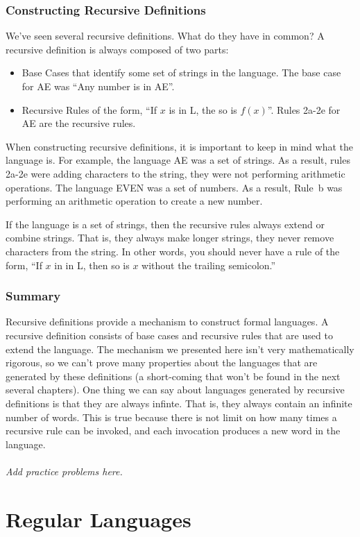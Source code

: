 \documentclass[letterpaper,12pt,openany,reqno]{book}%
\newcommand{\needsproblems}{\paragraph{Add practice problems here.}}
\begin{document}
\section{Constructing Recursive Definitions}
We've seen several recursive definitions. What do they have in common? A recursive definition is always composed of two parts:
\begin{itemize}
\item Base Cases that identify some set of strings in the language. The base case for AE was ``Any number is in AE''.
\item Recursive Rules of the form, ``If $x$ is in L, the so is $f(x)$''. Rules 2a-2e for AE are the recursive rules. 
\end{itemize}

When constructing recursive definitions, it is important to keep in mind what the language is. For example, the language AE was a set of strings. As a result, rules 2a-2e were adding characters to the string, they were not performing arithmetic operations. The language EVEN was a set of numbers. As a result, Rule~b was performing an arithmetic operation to create a new number.

If the language is a set of strings, then the recursive rules always extend or combine strings. That is, they always make longer strings, they never remove characters from the string. In other words, you should never have a rule of the form, ``If $x$ in in L, then so is $x$ without the trailing semicolon.''

\section{Summary}
Recursive definitions provide a mechanism to construct formal languages. A recursive definition consists of base cases and recursive rules that are used to extend the language. The mechanism we presented here isn't very mathematically rigorous, so we can't prove many properties about the languages that are generated by these definitions (a short-coming that won't be found in the next several chapters). One thing we can say about languages generated by recursive definitions is that they are always infinte. That is, they always contain an infinite number of words. This is true because there is not limit on how many times a recursive rule can be invoked, and each invocation produces a new word in the language.
\needsproblems{}

\part{Regular Languages}
\end{document}
